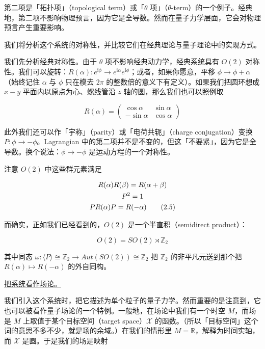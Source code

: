 第二项是「拓扑项」（topological term）或「$\theta$ 项」（$\theta$-term）的一个例子。经典地，第二项不影响物理预言，因为它是全导数。然而在量子力学层面，它会对物理预言产生重要影响。

我们将分析这个系统的对称性，并比较它们在经典理论与量子理论中的实现方式。

我们先分析经典对称性。由于 $\theta$ 项不影响经典动力学，经典系统具有 $O(2)$ 对称性。我们可以旋转：$R(\alpha):e^{\mathrm{i}\phi}\to e^{\mathrm{i}\alpha}e^{\mathrm{i}\phi}$；或者，如果你愿意，平移 $\phi\to\phi+\alpha$（始终记住 $\alpha$ 与 $\phi$ 只在模去 $2\pi$ 的整数倍的意义下有定义）。如果我们把圆环想成 $x-y$ 平面内以原点为心、螺线管沿 $z$ 轴的圆，那么我们也可以照例取

\begin{equation}
  R(\alpha)=
  \begin{pmatrix}
    \cos\alpha & \sin\alpha\\
    -\sin\alpha & \cos\alpha
  \end{pmatrix}
  \tag{2.4}
  \label{eq:2.4}
\end{equation}

此外我们还可以作「宇称」（parity）或「电荷共轭」（charge conjugation）变换 $P:\phi\to-\phi$。Lagrangian 中的第二项并不是不变的，但这「不要紧」，因为它是全导数。换个说法：$\phi\to-\phi$ 是运动方程的一个对称性。

注意 $O(2)$ 中这些群元素满足

\begin{gather}
  R(\alpha)R(\beta)=R(\alpha+\beta) \notag\\
  P^{2}=1 \notag\\
  PR(\alpha)P=R(-\alpha)
  \tag{2.5}
  \label{eq:2.5}
\end{gather}

而确实，正如我们已经看到的，$O(2)$ 是一个半直积（semidirect product）：

\begin{equation}
  O(2)=SO(2)\rtimes\mathbb{Z}_2
  \tag{2.6}
  \label{eq:2.6}
\end{equation}

其中同态 $\omega:\langle P\rangle\cong\mathbb{Z}_2\to Aut(SO(2))\cong\mathbb{Z}_2$ 把 $\mathbb{Z}_2$ 的非平凡元送到那个把 $R(\alpha)\mapsto R(-\alpha)$ 的外自同构。

\underline{把系统看作场论。}

我们引入这个系统时，把它描述为单个粒子的量子力学。然而重要的是注意到，它也可以被看作量子场论的一个特例。一般地，在场论中我们有一个时空 $M$，而场是 $M$ 上取值于某个目标空间（target space）$\mathcal{X}$ 的函数。（所以「目标空间」这个词的意思不多不少，就是场的余域。）在我们的情形里 $M=\mathbb{R}$，解释为时间实轴，而 $\mathcal{X}$ 是圆。于是我们的场是映射

